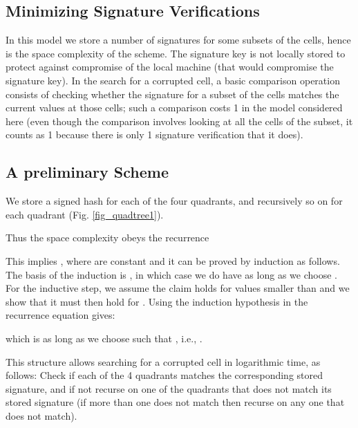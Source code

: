 \documentclass{llncs}
\begin{document}
\subsection{Minimizing Signature Verifications}
\label{SignedHashes}
In this model we store a number  of signatures for 
some subsets of the  cells, hence 
is the space complexity of the scheme.   The signature
key is not locally stored to protect against compromise of 
the local machine (that would compromise the signature key).
In the search for
a corrupted cell, a basic comparison operation consists of
checking whether the signature for a subset of the  cells
matches the current values at those cells; such a comparison
costs 1 in the model considered here (even though the comparison
involves looking at all the cells of the subset, it counts
as 1 because there is only 1 signature verification that it
does).

\subsection{A preliminary Scheme}
\label{PreliminaryScheme}

We store a signed hash for each of the four  
quadrants, and recursively so on for each quadrant (Fig. \ref{fig_quadtree1}).  

\begin{figure*}
\centerline{
\hfil
{}}
\caption{Preliminary Method}
\label{fig_quadtree1}
\end{figure*}

Thus the
space complexity obeys the recurrence





\noindent This implies ,
where  are constant and it can be proved by induction
as follows.  The basis of the induction is ,
in which case we do have  as
long as we choose . For
the inductive step, we assume the claim holds
for values smaller than  and we show that it
must then hold for .  Using the induction
hypothesis in the recurrence equation gives:



\noindent which is  as long as we choose
 such that , i.e., .

This structure allows searching for a corrupted cell in
logarithmic time, as follows:
Check if each of the 4 quadrants matches the corresponding
stored signature, and if not recurse on one of
the quadrants that
does not match its stored signature (if more than 
one does not match then recurse on any one 
that does not match).
\end{document}
